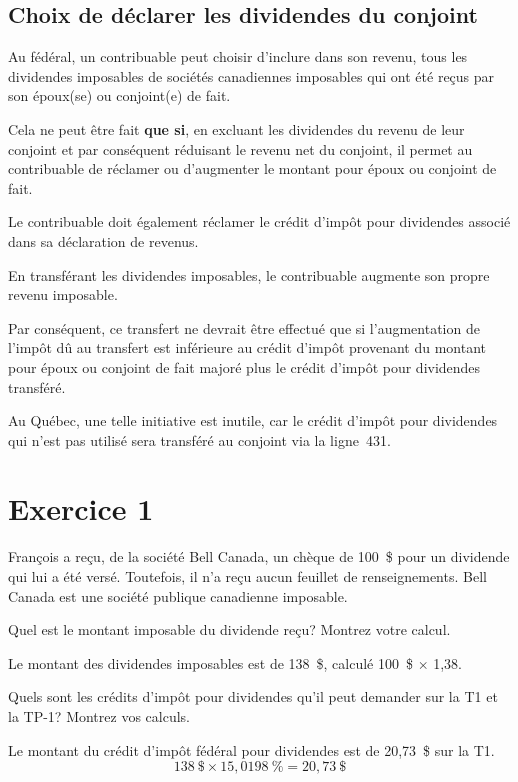 \subsection{Choix de déclarer les dividendes du conjoint}
Au fédéral, un contribuable peut choisir d'inclure dans son revenu, tous les dividendes imposables de sociétés canadiennes imposables qui ont été reçus par son époux(se) ou conjoint(e) de fait.

Cela ne peut être fait \textbf{que si}, en excluant les dividendes du revenu de leur conjoint  et par conséquent réduisant le revenu net du conjoint, il permet au contribuable de réclamer ou d'augmenter le montant pour époux ou conjoint de fait.

Le contribuable doit également réclamer le crédit d'impôt pour dividendes associé dans sa déclaration de revenus.

En transférant les dividendes imposables, le contribuable augmente son propre revenu imposable.

Par conséquent, ce transfert ne devrait être effectué que si l'augmentation de l'impôt dû au transfert est inférieure au crédit d'impôt provenant du montant pour époux ou conjoint de fait majoré plus le crédit d'impôt pour dividendes transféré.

Au Québec, une telle initiative est inutile, car le crédit d'impôt pour dividendes qui n'est pas utilisé sera transféré au conjoint via la ligne~431.




\section{Exercice 1}
\setcounter{question}{0}
\begin{question}
	François a reçu, de la société Bell Canada, un chèque de 100~\$ pour un dividende qui lui a été versé. Toutefois, il n'a reçu aucun feuillet de renseignements. Bell Canada est une société publique canadienne imposable.
\end{question}
\setcounter{sousQuestion}{0}
\begin{sousQuestion}
	Quel est le montant imposable du dividende reçu? Montrez votre calcul.
\end{sousQuestion}
Le montant des dividendes imposables est de 138~\$, calculé 100~\$ $\times$ 1,38.

\begin{sousQuestion}
	Quels sont les crédits d'impôt pour dividendes qu'il peut demander sur la T1 et la TP-1? Montrez vos calculs.
\end{sousQuestion}
Le montant du crédit d'impôt fédéral pour dividendes est de 20,73~\$ sur la T1.
\[ 138~\$ \times 15,0198~\% = 20,73~\$ \]

